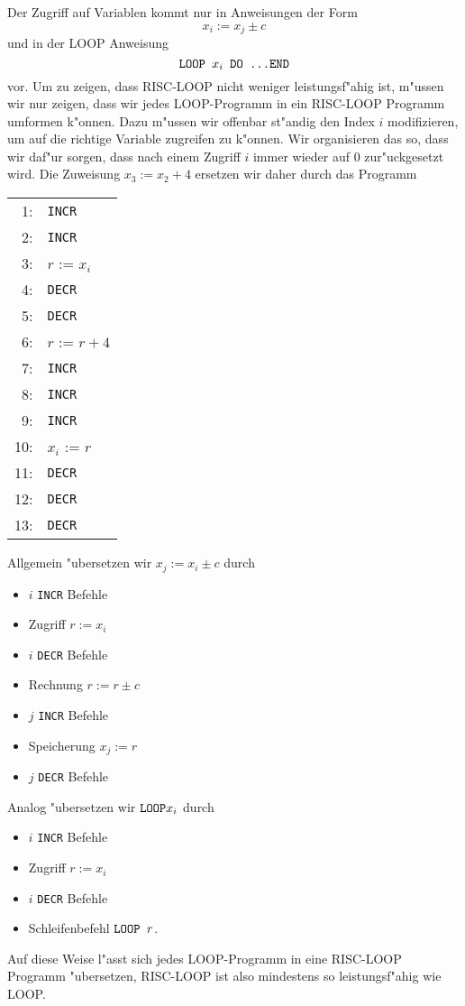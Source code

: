 \begin{loesung}
Der Zugriff auf Variablen kommt nur in Anweisungen der Form
\[
x_i:=x_j\pm c
\]
und in der LOOP Anweisung
\[
\text{\tt LOOP $x_i$ DO \dots END}
\]
vor. Um zu zeigen, dass RISC-LOOP nicht weniger leistungsf"ahig ist, m"ussen
wir nur zeigen, dass wir jedes LOOP-Programm in ein RISC-LOOP Programm
umformen k"onnen. Dazu m"ussen wir offenbar st"andig den Index $i$ modifizieren,
um auf die richtige Variable zugreifen zu k"onnen. Wir organisieren das
so, dass wir daf"ur sorgen, dass nach einem Zugriff $i$ immer wieder auf
$0$ zur"uckgesetzt wird. Die Zuweisung $x_3:=x_2+4$ ersetzen wir daher durch das Programm
\begin{center}
\begin{tabular}{r<{:}l}
1&{\tt INCR}\\
2&{\tt INCR}\\
3&$r$ := $x_i$\\
4&{\tt DECR}\\
5&{\tt DECR}\\
6&$r$ := $r + 4$\\
7&{\tt INCR}\\
8&{\tt INCR}\\
9&{\tt INCR}\\
10&$x_i$ := $r$\\
11&{\tt DECR}\\
12&{\tt DECR}\\
13&{\tt DECR}
\end{tabular}
\end{center}
Allgemein "ubersetzen wir $x_j:=x_i\pm c$ durch
\begin{itemize}
\item $i$ {\tt INCR} Befehle
\item Zugriff $r:=x_i$
\item $i$ {\tt DECR} Befehle
\item Rechnung $r:=r\pm c$
\item $j$ {\tt INCR} Befehle

\item Speicherung $x_j:=r$
\item $j$ {\tt DECR} Befehle
\end{itemize}
Analog "ubersetzen wir $\text{\tt LOOP} x_i$ durch
\begin{itemize}
\item $i$ {\tt INCR} Befehle
\item Zugriff $r:=x_i$
\item $i$ {\tt DECR} Befehle
\item Schleifenbefehl $\text{\tt LOOP }r$.
\end{itemize}
Auf diese Weise l"asst sich jedes LOOP-Programm in eine RISC-LOOP Programm
"ubersetzen, RISC-LOOP ist also mindestens so leistungsf"ahig wie LOOP.
\end{loesung}
